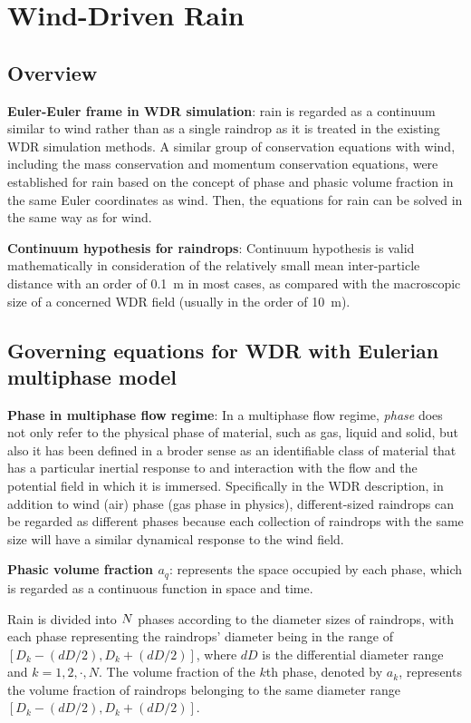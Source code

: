 \chapter{Wind-Driven Rain}

\section{Overview}
\textbf{Euler-Euler frame in WDR simulation}\cite{Huang2011WDR}: 
rain is regarded as a continuum similar to wind rather than as a single raindrop as it is treated in the existing WDR simulation methods. 
A similar group of conservation equations with wind, including the mass conservation and momentum conservation equations, 
were established for rain based on the concept of phase and phasic volume fraction in the same Euler coordinates as wind. 
Then, the equations for rain can be solved in the same way as for wind.

\textbf{Continuum hypothesis for raindrops}\cite{Huang2010WDR}:
Continuum hypothesis is valid mathematically in consideration of the relatively small mean inter-particle distance with an order of \SI{0.1}{m}
in most cases, as compared with the macroscopic size of a concerned WDR field (usually in the order of \SI{10}{m}).


\section{Governing equations for WDR with Eulerian multiphase model}
\textbf{Phase in multiphase flow regime}\cite{Huang2010WDR}:
In a multiphase flow regime, \textit{phase} does not only refer to the physical phase of material, such as gas, liquid and solid,
but also it has been defined in a broder sense as an identifiable class of material that has a particular inertial response to
and interaction with the flow and the potential field in which it is immersed.
Specifically in the WDR description, in addition to wind (air) phase (gas phase in physics), 
different-sized raindrops can be regarded as different phases because each collection of raindrops with the same size will have a similar dynamical response to the wind field.

\textbf{Phasic volume fraction $a_q$}:
represents the space occupied by each phase, which is regarded as a continuous function in space and time.

Rain is divided into $\mathnormal{N}$ phases according to the diameter sizes of raindrops, 
with each phase representing the raindrops' diameter being in the range of $\left[D_k-(dD/2), D_k+(dD/2)\right]$,
where $dD$ is the differential diameter range and $k=1,2,\cdot,N.$
The volume fraction of the $k$th phase, denoted by $a_k$, 
represents the volume fraction of raindrops belonging to the same diameter range $\left[D_k-(dD/2), D_k+(dD/2)\right]$.

